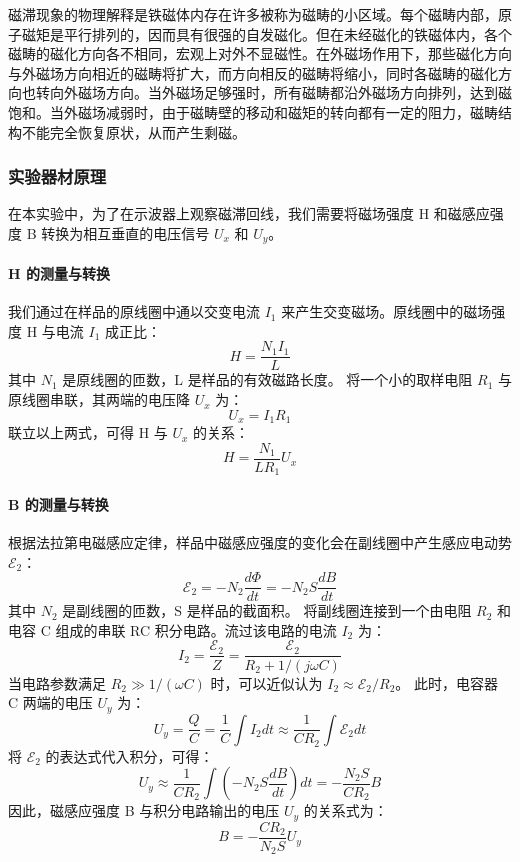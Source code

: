 \documentclass[]{../template/Report}%
\begin{document}
磁滞现象的物理解释是铁磁体内存在许多被称为磁畴的小区域。每个磁畴内部，原子磁矩是平行排列的，因而具有很强的自发磁化。但在未经磁化的铁磁体内，各个磁畴的磁化方向各不相同，宏观上对外不显磁性。在外磁场作用下，那些磁化方向与外磁场方向相近的磁畴将扩大，而方向相反的磁畴将缩小，同时各磁畴的磁化方向也转向外磁场方向。当外磁场足够强时，所有磁畴都沿外磁场方向排列，达到磁饱和。当外磁场减弱时，由于磁畴壁的移动和磁矩的转向都有一定的阻力，磁畴结构不能完全恢复原状，从而产生剩磁。

\subsubsection{实验器材原理}
在本实验中，为了在示波器上观察磁滞回线，我们需要将磁场强度 H 和磁感应强度 B 转换为相互垂直的电压信号 $U_x$ 和 $U_y$。

\paragraph{H 的测量与转换}
我们通过在样品的原线圈中通以交变电流 $I_1$ 来产生交变磁场。原线圈中的磁场强度 H 与电流 $I_1$ 成正比：
\begin{equation}
    H = \frac{N_1 I_1}{L}
\end{equation}
其中 $N_1$ 是原线圈的匝数，L 是样品的有效磁路长度。
将一个小的取样电阻 $R_1$ 与原线圈串联，其两端的电压降 $U_x$ 为：
\begin{equation}
    U_x = I_1 R_1
\end{equation}
联立以上两式，可得 H 与 $U_x$ 的关系：
\begin{equation}
    \boxed{H = \frac{N_1}{L R_1} U_x}
\end{equation}

\paragraph{B 的测量与转换}
根据法拉第电磁感应定律，样品中磁感应强度的变化会在副线圈中产生感应电动势 $\mathcal{E}_2$：
\begin{equation}
    \mathcal{E}_2 = -N_2 \frac{d\Phi}{dt} = -N_2 S \frac{dB}{dt}
\end{equation}
其中 $N_2$ 是副线圈的匝数，S 是样品的截面积。
将副线圈连接到一个由电阻 $R_2$ 和电容 C 组成的串联 RC 积分电路。流过该电路的电流 $I_2$ 为：
\begin{equation}
    I_2 = \frac{\mathcal{E}_2}{Z} = \frac{\mathcal{E}_2}{R_2 + 1/(j\omega C)}
\end{equation}
当电路参数满足 $R_2 \gg 1/(\omega C)$ 时，可以近似认为 $I_2 \approx \mathcal{E}_2 / R_2$。
此时，电容器 C 两端的电压 $U_y$ 为：
\begin{equation}
    U_y = \frac{Q}{C} = \frac{1}{C} \int I_2 dt \approx \frac{1}{CR_2} \int \mathcal{E}_2 dt
\end{equation}
将 $\mathcal{E}_2$ 的表达式代入积分，可得：
\begin{equation}
    U_y \approx \frac{1}{CR_2} \int \left(-N_2 S \frac{dB}{dt}\right) dt = -\frac{N_2 S}{C R_2} B
\end{equation}
因此，磁感应强度 B 与积分电路输出的电压 $U_y$ 的关系式为：
\begin{equation}
    \boxed{B = -\frac{C R_2}{N_2 S} U_y}
\end{equation}
\end{document}
